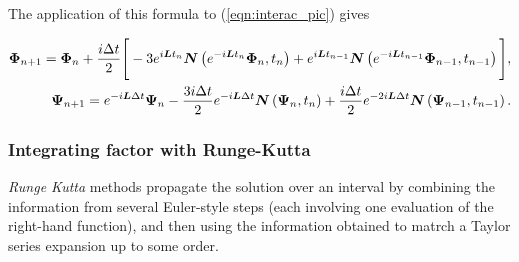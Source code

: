 The application of this formula to (\ref{eqn:interac_pic}) gives 

\begin{align}
   \boldsymbol{\rm \Phi}_{n+1} = \boldsymbol{\rm \Phi}_{n} 
      + \frac{i\Delta t}{2}
\Bigg[ -3e^{i\boldsymbol{L}t_n}\boldsymbol{N}\left( e^{-i\boldsymbol{L}t_n}
       \boldsymbol{\Phi}_n,t_n\right)
+ e^{i\boldsymbol{L}t_{n-1}}\boldsymbol{N}\left( e^{-i\boldsymbol{L}t_{n-1}}
       \boldsymbol{\Phi}_{n-1},t_{n-1}\right)\Bigg], \\
\boldsymbol{\rm \Psi}_{n+1} = 
      e^{-i\boldsymbol{L}\Delta t}\boldsymbol{\rm \Psi}_{n} 
 -\frac{3i\Delta t}{2} e^{-i\boldsymbol{L}\Delta t}
       \boldsymbol{N}\left(\boldsymbol{\Psi}_n,t_n\right)
+ \frac{i\Delta t}{2} e^{-2i\boldsymbol{L}\Delta t}\boldsymbol{N}
\left(\boldsymbol{\Psi}_{n-1},t_{n-1}\right).
\end{align}

\subsubsection{Integrating factor with Runge-Kutta}
\emph{Runge Kutta} methods propagate the solution over an interval
by combining the information from several Euler-style steps (each involving
one evaluation of the right-hand function), 
and then using the information obtained to matrch a Taylor series 
expansion up to some order. \\



